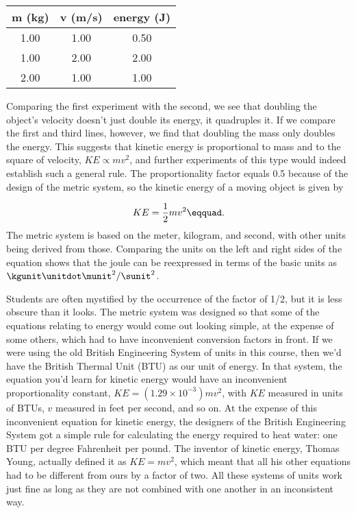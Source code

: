 \begin{tabular}{|c|c|c|} \hline
\textbf{m} (kg) & \textbf{v} (m/s) & \textbf{energy} (J) \\ \hline
1.00 & 1.00 & 0.50 \\ \hline
1.00 & 2.00 & 2.00 \\ \hline
2.00 & 1.00 & 1.00 \\ \hline
\end{tabular}

Comparing the first experiment with the second, we see that
doubling the object's velocity doesn't just double its
energy, it quadruples it. If we compare the first and third
lines, however, we find that doubling the mass only doubles
the energy. This suggests that kinetic energy is proportional
to mass and to the square of velocity, $KE\propto mv^2$, and further
experiments of this type would indeed establish such a
general rule. The proportionality factor equals 0.5 because
of the design of the metric system, so the kinetic energy of
a moving object is given by

\begin{equation*}
                KE    =    \frac{1}{2}mv^2\eqquad.
\end{equation*}
The metric system is based on the meter, kilogram, and
second, with other units being derived from those. Comparing
the units on the left and right sides of the equation shows
that the joule can be reexpressed in terms of the basic
units as $\kgunit\unitdot\munit^2/\sunit^2$.

Students are often mystified by the occurrence of the factor\label{ke-why-one-half}
of 1/2, but it is less obscure than it looks. The metric
system was designed so that some of the equations relating
to energy would come out looking simple, at the expense of
some others, which had to have inconvenient conversion
factors in front. If we were using the old British
Engineering System of units in this course, then we'd have
the British Thermal Unit (BTU) as our unit of energy. In
that system, the equation you'd learn for kinetic energy
would have an inconvenient proportionality constant,
$KE=\left(1.29\times10^{-3}\right)mv^2$, with $KE$ measured
in units of BTUs, $v$ measured in feet per second, and so on.
At the expense of this inconvenient equation for kinetic
energy, the designers of the British Engineering System got
a simple rule for calculating the energy required to heat
water: one BTU per degree Fahrenheit per pound. The
inventor of kinetic energy, Thomas Young, actually defined
it as $KE=mv^2$, which meant that all his other
equations had to be different from ours by a factor of two.
All these systems of units work just fine as long as they
are not combined with one another in an inconsistent way.

